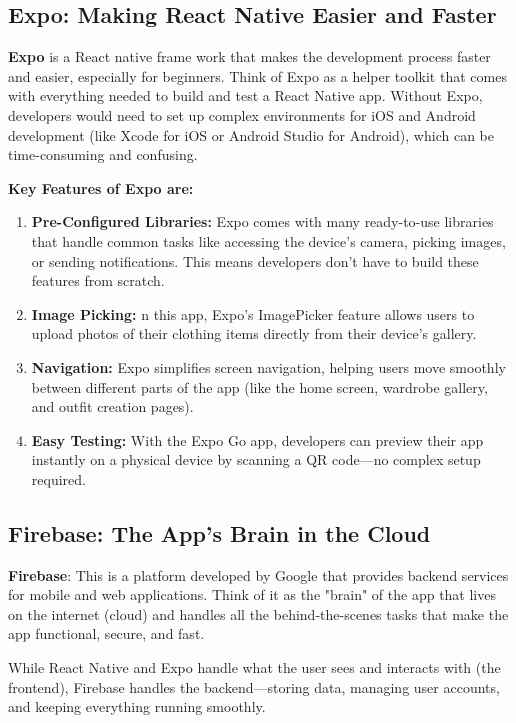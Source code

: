 \subsection{Expo: Making React Native Easier and Faster}
   \textbf{Expo} is a React native frame work that makes the development process faster and easier, especially for beginners. Think of Expo as a helper toolkit that comes with everything needed to build and test a React Native app. Without Expo, developers would need to set up complex environments for iOS and Android development (like Xcode for iOS or Android Studio for Android), which can be time-consuming and confusing.

   \textbf{Key Features of Expo are:}
\begin{enumerate}
\item \textbf{Pre-Configured Libraries:} Expo comes with many ready-to-use libraries that handle common tasks like accessing the device’s camera, picking images, or sending notifications. This means developers don’t have to build these features from scratch.
\item \textbf{Image Picking: } n this app, Expo’s ImagePicker feature allows users to upload photos of their clothing items directly from their device’s gallery.
\item \textbf{Navigation:} Expo simplifies screen navigation, helping users move smoothly between different parts of the app (like the home screen, wardrobe gallery, and outfit creation pages).
\item \textbf{Easy Testing:} With the Expo Go app, developers can preview their app instantly on a physical device by scanning a QR code—no complex setup required. 
\end{enumerate}
   
\subsection{Firebase: The App’s Brain in the Cloud}
 \textbf{Firebase}: This is a platform developed by Google that provides backend services for mobile and web applications. Think of it as the "brain" of the app that lives on the internet (cloud) and handles all the behind-the-scenes tasks that make the app functional, secure, and fast.

While React Native and Expo handle what the user sees and interacts with (the frontend), Firebase handles the backend—storing data, managing user accounts, and keeping everything running smoothly.

